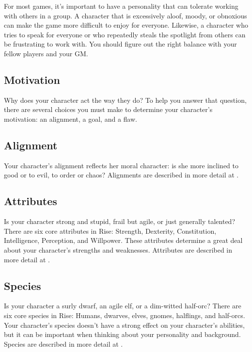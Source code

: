         For most games, it's important to have a personality that can tolerate working with others in a group.
        A character that is excessively aloof, moody, or obnoxious can make the game more difficult to enjoy for everyone.
        Likewise, a character who tries to speak for everyone or who repeatedly steals the spotlight from others can be frustrating to work with.
        You should figure out the right balance with your fellow players and your GM.\@

    \subsection{Motivation}

        Why does your character act the way they do?
        To help you answer that question, there are several choices you must make to determine your character's motivation: an alignment, a goal, and a flaw.

    \subsection{Alignment}

        Your character's alignment reflects her moral character: is she more inclined to good or to evil, to order or chaos?
        Alignments are described in more detail at .

    \subsection{Attributes}
        Is your character strong and stupid, frail but agile, or just generally talented?
        There are six core attributes in Rise: Strength, Dexterity, Constitution, Intelligence, Perception, and Willpower.
        These attributes determine a great deal about your character's strengths and weaknesses.
        Attributes are described in more detail at .

    \subsection{Species}
        Is your character a surly dwarf, an agile elf, or a dim-witted half-orc?
        There are six core species in Rise: Humans, dwarves, elves, gnomes, halflings, and half-orcs.
        Your character's species doesn't have a strong effect on your character's abilities, but it can be important when thinking about your personality and background.
        Species are described in more detail at .

